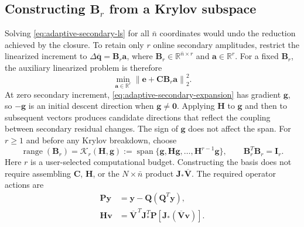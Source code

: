 \documentclass[11pt]{article}
\newcommand{\qbar}{\overline{\mathbf q}}
\newcommand{\norm}[1]{\left\lVert #1 \right\rVert}
\begin{document}
\subsection{Constructing \texorpdfstring{$\mathbf B_r$}{Br} from a Krylov subspace}
Solving \eqref{eq:adaptive-secondary-ls} for all $\bar n$ coordinates
would undo the reduction achieved by the closure.  To retain only $r$
online secondary amplitudes, restrict the linearized increment to
$\Delta\qbar=\mathbf B_r\mathbf a$, where
$\mathbf B_r\in\mathbb R^{\bar n\times r}$ and
$\mathbf a\in\mathbb R^r$.  For a fixed $\mathbf B_r$, the auxiliary
linearized problem is therefore
\begin{equation}
\min_{\mathbf a\in\mathbb R^r}
\norm{\mathbf e+\mathbf C\mathbf B_r\mathbf a}_2^2.
\label{eq:adaptive-restricted-secondary-ls}
\end{equation}
At zero secondary increment, \eqref{eq:adaptive-secondary-expansion}
has gradient $\mathbf g$, so $-\mathbf g$ is an initial descent
direction when $\mathbf g\ne\mathbf0$.  Applying $\mathbf H$ to
$\mathbf g$ and then to subsequent vectors produces candidate directions
that reflect the coupling between secondary residual changes.
The sign of $\mathbf g$ does not affect the span.  For $r\geq1$ and
before any Krylov breakdown, choose
\begin{equation}
\operatorname{range}(\mathbf B_r)=\mathcal K_r(\mathbf H,\mathbf g)
:=\operatorname{span}\{\mathbf g,\mathbf H\mathbf g,\ldots,
\mathbf H^{r-1}\mathbf g\},\qquad \mathbf B_r^T\mathbf B_r=\mathbf I_r.
\label{eq:adaptive-krylov}
\end{equation}
Here $r$ is a user-selected computational budget.  Constructing the
basis does not require assembling $\mathbf C$, $\mathbf H$, or the
$N\times\bar n$ product $\mathbf J_*\overline{\mathbf V}$.  The required
operator actions are
\begin{equation}
\begin{aligned}
\mathbf P\mathbf y&=\mathbf y-\mathbf Q(\mathbf Q^T\mathbf y),\\
\mathbf H\mathbf v&=\overline{\mathbf V}^{\,T}\mathbf J_*^T
\mathbf P\left[\mathbf J_*(\overline{\mathbf V}\mathbf v)\right].
\end{aligned}
\label{eq:adaptive-actions}
\end{equation}
\end{document}
